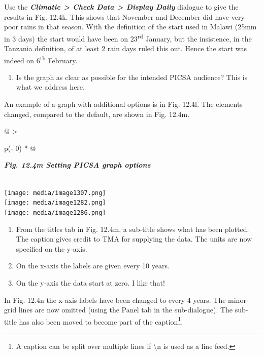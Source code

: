 \documentclass[
  letterpaper,
  DIV=11,
  numbers=noendperiod]{scrreprt}
\providecommand{\tightlist}{%
  \setlength{\itemsep}{0pt}\setlength{\parskip}{0pt}}\usepackage{longtable,booktabs,array}
\begin{document}
Use the \textbf{\emph{Climatic \textgreater{} Check Data \textgreater{}
Display Daily}} dialogue to give the results in Fig. 12.4k. This shows
that November and December did have very poor rains in that season. With
the definition of the start used in Malawi (25mm in 3 days) the start
would have been on 23\textsuperscript{rd} January, but the insistence,
in the Tanzania definition, of at least 2 rain days ruled this out.
Hence the start was indeed on 6\textsuperscript{th} February.

\begin{enumerate}
\def\labelenumi{\alph{enumi})}
\setcounter{enumi}{2}
\tightlist
\item
  Is the graph as clear as possible for the intended PICSA audience?
  This is what we address here.
\end{enumerate}

An example of a graph with additional options is in Fig. 12.4l. The
elements changed, compared to the default, are shown in Fig. 12.4m.

\begin{longtable}[]{@{}
  >{\raggedright\arraybackslash}p{(\columnwidth - 0\tabcolsep) * }@{}}
\toprule\noalign{}
\begin{minipage}[b]{\linewidth}\raggedright
\textbf{\emph{Fig. 12.4m Setting PICSA graph options}}
\end{minipage} \\
\midrule\noalign{}
\endhead
\bottomrule\noalign{}
\endlastfoot
\texttt{[image: media/image1307.png]} \\
\texttt{[image: media/image1282.png]} \\
\texttt{[image: media/image1286.png]} \\
\end{longtable}

\begin{enumerate}
\def\labelenumi{\arabic{enumi})}
\item
  From the titles tab in Fig. 12.4m, a sub-title shows what has been
  plotted. The caption gives credit to TMA for supplying the data. The
  units are now specified on the y-axis.
\item
  On the x-axis the labels are given every 10 years.
\item
  On the y-axis the data start at zero. I like that!
\end{enumerate}

In Fig. 12.4n the x-axis labels have been changed to every 4 years. The
minor-grid lines are now omitted (using the Panel tab in the
sub-dialogue). The sub-title has also been moved to become part of the
caption\footnote{A caption can be split over multiple lines if
  \textbackslash n is used as a line feed.}.
\end{document}
